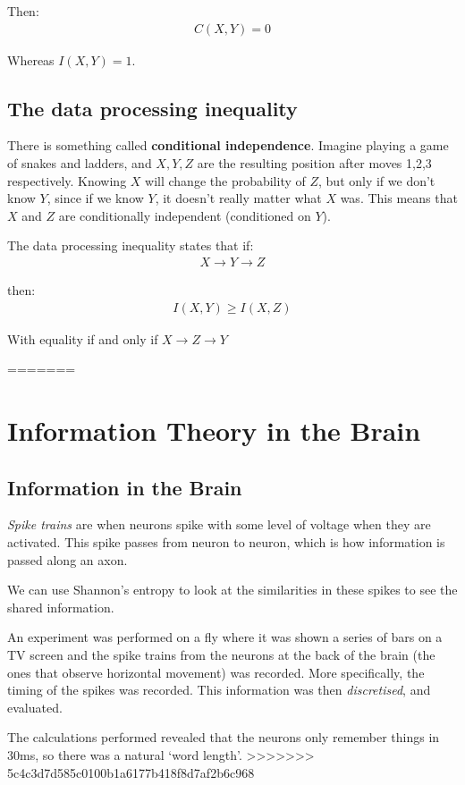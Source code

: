 \documentclass[11pt,a4paper,titlepage,dvipsnames,cmyk]{scrartcl}
\begin{document}
Then:
\begin{align*}
C(X,Y) = 0
\end{align*}

Whereas $I(X,Y) = 1$.

\subsection{The data processing inequality}
There is something called \textbf{conditional independence}. Imagine playing a game of snakes and ladders, and $X,Y,Z$ are the resulting position after moves 1,2,3 respectively. Knowing $X$ will change the probability of $Z$, but only if we don't know $Y$, since if we know $Y$, it doesn't really matter what $X$ was. This means that $X$ and $Z$ are conditionally independent (conditioned on $Y$).

The data processing inequality states that if:
\begin{align*}
X \rightarrow Y \rightarrow Z
\end{align*}

then:
\begin{align*}
I(X,Y) \ge I(X,Z)
\end{align*}

With equality if and only if $X \rightarrow Z \rightarrow Y$

=======
\section{Information Theory in the Brain}
\subsection{Information in the Brain}
\textit{Spike trains} are when neurons spike with some level of voltage when they are activated. This spike passes from neuron to neuron, which is how information is passed along an axon.

We can use Shannon's entropy to look at the similarities in these spikes to see the shared information.

An experiment was performed on a fly where it was shown a series of bars on a TV screen and the spike trains from the neurons at the back of the brain (the ones that observe horizontal movement) was recorded. More specifically, the timing of the spikes was recorded. This information was then \textit{discretised}, and evaluated.

The calculations performed revealed that the neurons only remember things in 30ms, so there was a natural `word length'. 
>>>>>>> 5c4c3d7d585c0100b1a6177b418f8d7af2b6c968
\end{document}
